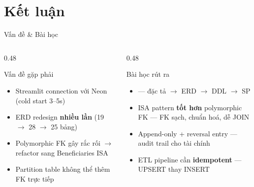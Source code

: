 \section{Kết luận}

\begin{frame}{Vấn đề \& Bài học}
    \begin{columns}[T]
        \begin{column}{0.48\textwidth}
            \begin{alertblock}{Vấn đề gặp phải}
                \begin{itemize}\small
                    \item Streamlit connection 
                          với Neon (cold start 3--5s)
                    \item ERD redesign \textbf{nhiều lần}
                          {\scriptsize (19 $\to$ 28 $\to$ 25 bảng)}
                    \item Polymorphic FK gây rắc rối
                          {\scriptsize $\to$ refactor sang Beneficiaries ISA}
                    \item Partition table không thể thêm FK trực tiếp
                \end{itemize}
            \end{alertblock}
        \end{column}
        \begin{column}{0.48\textwidth}
            \begin{exampleblock}{Bài học rút ra}
                \begin{itemize}\small
                    \item {}
                          {\scriptsize --- đặc tả $\to$ ERD $\to$ DDL $\to$ SP}
                    \item ISA pattern \textbf{tốt hơn} polymorphic FK
                          {\scriptsize --- FK sạch, chuẩn hoá, dễ JOIN}
                    \item Append-only + reversal entry
                          {\scriptsize --- audit trail cho tài chính}
                    \item ETL pipeline cần \textbf{idempotent}
                          {\scriptsize --- UPSERT thay INSERT}
                \end{itemize}
            \end{exampleblock}
        \end{column}
    \end{columns}

\end{frame}

